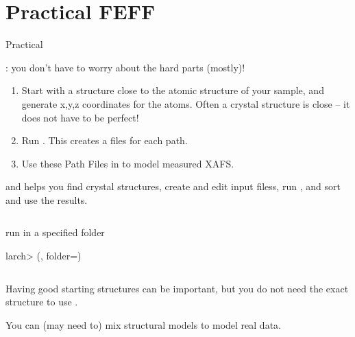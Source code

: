 \section{Practical FEFF}

\begin{slide}{ Practical {\feff} }

  \begin{cenpage}{120mm}

{}: you don't have to worry about the hard parts (mostly)!

\begin{enumerate}
\item Start with a structure close to the {} atomic structure
  of your sample, and generate x,y,z coordinates for the atoms. Often a
  crystal structure is close -- it does not have to be perfect!

\item Run {\feff}.  This creates a {\feffndat} files for each path.

\item Use these  Path Files in to model measured XAFS.
\end{enumerate}

  {\larch} and {\xasviewer} helps you find crystal structures, create and
  edit input filess, run {\feff}, and sort and use the results.

\begin{columns}
      \begin{column}[T]{88mm}
        \begin{block}{ run {\feff} in a specified folder  }
          \begin{semiverbatim} {\footnotesize larch>
{}({}, folder={}) }
          \end{semiverbatim}
        \end{block}

      \end{column}
      \begin{column}[T]{1mm} \end{column}
    \end{columns}


    \vmm\vmm

  Having good starting structures can be important, but you do not need the
  exact structure to use {\feff}.

\vmm

  You can (may need to) mix structural models to model real data.

  \end{cenpage}

\end{slide}

